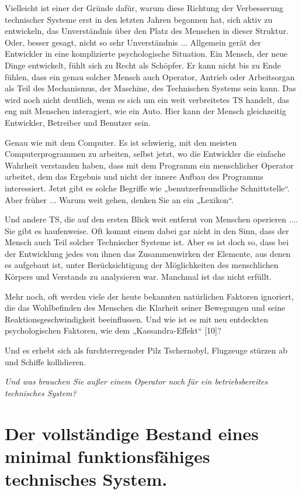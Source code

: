 \documentclass[11pt,a4paper]{article}
\begin{document}
Vielleicht ist einer der Gründe dafür, warum diese Richtung der Verbesserung
technischer Systeme erst in den letzten Jahren begonnen hat, sich aktiv zu
entwickeln, das Unverständnis über den Platz des Menschen in dieser Struktur.
Oder, besser gesagt, nicht so sehr Unverständnis ...  Allgemein gerät der
Entwickler in eine komplizierte psychologische Situation. Ein Mensch, der neue
Dinge entwickelt, fühlt sich zu Recht als Schöpfer. Er kann nicht bis zu Ende
fühlen, dass ein genau solcher Mensch auch Operator, Antrieb oder Arbeitsorgan
als Teil des Mechanismus, der Maschine, des Technischen Systems sein kann.
Das wird noch nicht deutlich, wenn es sich um ein weit verbreitetes TS
handelt, das eng mit Menschen interagiert, wie ein Auto. Hier kann der Mensch
gleichzeitig Entwickler, Betreiber und Benutzer sein.

Genau wie mit dem Computer. Es ist schwierig, mit den meisten
Computerprogrammen zu arbeiten, selbst jetzt, wo die Entwickler die einfache
Wahrheit verstanden haben, dass mit dem Programm ein menschlicher Operator
arbeitet, dem das Ergebnis und nicht der innere Aufbau des Programms
interessiert.  Jetzt gibt es solche Begriffe wie „benutzerfreundliche
Schnittstelle“.  Aber früher ... Warum weit gehen, denken Sie an ein
„Lexikon“.

Und andere TS, die auf den ersten Blick weit entfernt von Menschen operieren
.... Sie gibt es haufenweise.  Oft kommt einem dabei gar nicht in den Sinn,
dass der Mensch auch Teil solcher Technischer Systeme ist.  Aber es ist doch
so, dass bei der Entwicklung jedes von ihnen das Zusammenwirken der Elemente,
aus denen es aufgebaut ist, unter Berücksichtigung der Möglichkeiten des
menschlichen Körpers und Verstands zu analysieren war. Manchmal ist das nicht
erfüllt.

Mehr noch, oft werden viele der heute bekannten natürlichen Faktoren
ignoriert, die das Wohlbefinden des Menschen die Klarheit seiner Bewegungen
und seine Reaktionsgeschwindigkeit beeinflussen. Und wie ist es mit neu
entdeckten psychologischen Faktoren, wie dem „Kassandra-Effekt“ [10]?

Und es erhebt sich als furchterregender Pilz Tschernobyl, Flugzeuge stürzen ab
und Schiffe kollidieren.

\emph{Und was brauchen Sie außer einem Operator noch für ein betriebsbereites
  technisches System?}

\section*{Der vollständige Bestand eines minimal funktionsfähiges technisches
  System.} 
\end{document}
